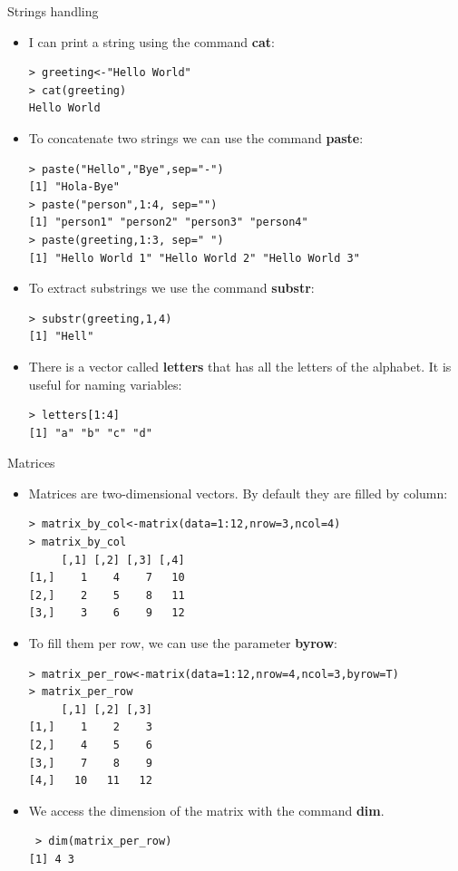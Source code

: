 \documentclass[handout]{beamer}
\begin{document}
\begin{frame}[fragile]{Strings handling}
\scriptsize{
 \begin{itemize}
  \item I can print a string using the command \textbf{cat}:
\begin{verbatim}
> greeting<-"Hello World"
> cat(greeting)
Hello World
\end{verbatim}

\item To concatenate two strings we can use the command \textbf{paste}:
\begin{verbatim}
> paste("Hello","Bye",sep="-")
[1] "Hola-Bye"
> paste("person",1:4, sep="")
[1] "person1" "person2" "person3" "person4"
> paste(greeting,1:3, sep=" ")
[1] "Hello World 1" "Hello World 2" "Hello World 3"
\end{verbatim}

\item To extract substrings we use the command \textbf{substr}:
\begin{verbatim}
> substr(greeting,1,4)
[1] "Hell" 
\end{verbatim}

\item There is a vector called \textbf{letters} that has all the letters of the alphabet. It is useful for naming variables:
\begin{verbatim}
> letters[1:4]
[1] "a" "b" "c" "d" 
\end{verbatim}


 \end{itemize}

 }
\end{frame}


\begin{frame}[fragile]{Matrices}
\scriptsize{
 \begin{itemize}
  \item Matrices are two-dimensional vectors. By default they are filled by column:
 \begin{verbatim}
> matrix_by_col<-matrix(data=1:12,nrow=3,ncol=4)
> matrix_by_col
     [,1] [,2] [,3] [,4]
[1,]    1    4    7   10
[2,]    2    5    8   11
[3,]    3    6    9   12 
 \end{verbatim}
 \item To fill them per row, we can use the parameter \textbf{byrow}:
 \begin{verbatim}
> matrix_per_row<-matrix(data=1:12,nrow=4,ncol=3,byrow=T)
> matrix_per_row
     [,1] [,2] [,3]
[1,]    1    2    3
[2,]    4    5    6
[3,]    7    8    9
[4,]   10   11   12  
 \end{verbatim}

 \item We access the dimension of the matrix with the command \textbf{dim}.
 \begin{verbatim}
 > dim(matrix_per_row)
[1] 4 3 
 \end{verbatim}

 \end{itemize} 
 }
\end{frame}
\end{document}
